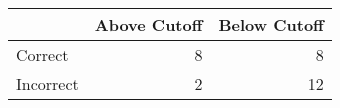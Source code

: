 \begin{tabular}{lrr}
\toprule
 & Above Cutoff & Below Cutoff \\
\midrule
Correct & 8 & 8 \\
Incorrect & 2 & 12 \\
\bottomrule
\end{tabular}
